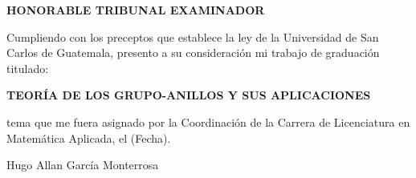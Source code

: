 \thispagestyle{empty}

\begin{center}
{\large \textbf{HONORABLE TRIBUNAL EXAMINADOR}}
\end{center}

\vspace{60pt}

\noindent Cumpliendo con los preceptos que establece la ley de la
Universidad de San Carlos de Guatemala, presento a su consideración
mi trabajo de graduación titulado:

\vspace{24pt}

\begin{center}
\textbf{\large TEORÍA DE LOS GRUPO-ANILLOS Y SUS APLICACIONES}
\end{center}

\vspace{24pt}

\noindent tema que me fuera asignado por la Coordinación de la
Carrera de Licenciatura en Matemática Aplicada, el (Fecha).

\vspace{54pt}

\begin{flushright}
Hugo Allan García Monterrosa
\end{flushright}
